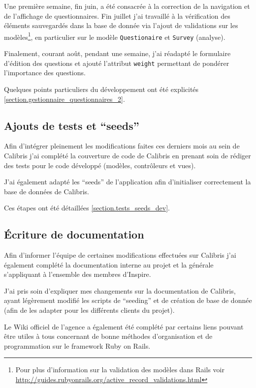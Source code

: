 \documentclass[12pt,a4paper]{book}
\begin{document}
Une première semaine, fin juin, a été consacrée à la correction de la navigation et de l'affichage de questionnaires. Fin juillet j'ai travaillé à la vérification des éléments sauvegardés dans la base de donnée via l'ajout de validations sur les modèles\footnote{Pour plus d'information sur la validation des modèles dans Rails voir \url{http://guides.rubyonrails.org/active_record_validations.html}}, en particulier sur le modèle \texttt{Questionaire} et \texttt{Survey} (analyse).

Finalement, courant août, pendant une semaine, j'ai réadapté le formulaire d'édition des questions et ajouté l'attribut \texttt{weight} permettant de pondérer l'importance des questions.

Quelques points particuliers du développement ont été explicités \cref{section.gestionnaire_questionnaires_2}.

\subsection{Ajouts de tests et ``seeds''}

Afin d'intégrer pleinement les modifications faites ces derniers mois au sein de Calibris j'ai complété la couverture de code de Calibris en prenant soin de rédiger des tests pour le code développé (modèles, contrôleurs et vues).

J'ai également adapté les ``seeds'' de l'application afin d'initialiser correctement la base de données de Calibris. 

Ces étapes ont été détaillées \cref{section.tests_seeds_dev}.

\subsection{Écriture de documentation}

Afin d'informer l'équipe de certaines modifications effectuées sur Calibris j'ai également complété la documentation interne au projet et la générale s'appliquant à l'ensemble des membres d'Inspire.

J'ai pris soin d'expliquer mes changements sur la documentation de Calibris, ayant légèrement modifié les scripts de ``seeding'' et de création de base de donnée (afin de les adapter pour les différents clients du projet).

Le Wiki officiel de l'agence a également été complété par certains liens pouvant être utiles à tous concernant de bonne méthodes d'organisation et de programmation sur le framework Ruby on Rails.
\end{document}
